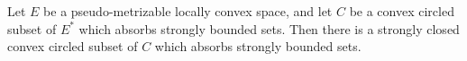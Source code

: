Let $E$ be a pseudo-metrizable locally convex space, and let $C$ be a convex circled subset of $E^{*}$ which absorbs strongly bounded sets. Then there is a strongly closed convex circled subset of $C$ which absorbs strongly bounded sets.
